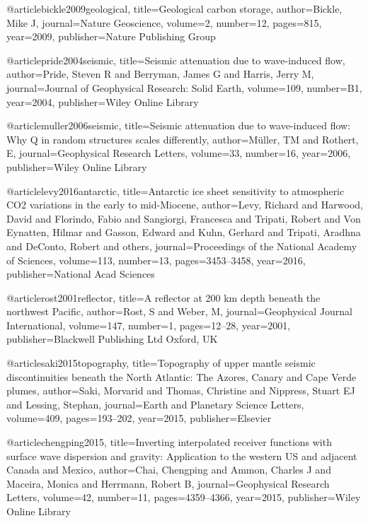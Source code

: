 @article{bickle2009geological,
  title={Geological carbon storage},
  author={Bickle, Mike J},
  journal={Nature Geoscience},
  volume={2},
  number={12},
  pages={815},
  year={2009},
  publisher={Nature Publishing Group}
}

@article{pride2004seismic,
  title={Seismic attenuation due to wave-induced flow},
  author={Pride, Steven R and Berryman, James G and Harris, Jerry M},
  journal={Journal of Geophysical Research: Solid Earth},
  volume={109},
  number={B1},
  year={2004},
  publisher={Wiley Online Library}
}

@article{muller2006seismic,
  title={Seismic attenuation due to wave-induced flow: Why Q in random structures scales differently},
  author={M{\"u}ller, TM and Rothert, E},
  journal={Geophysical Research Letters},
  volume={33},
  number={16},
  year={2006},
  publisher={Wiley Online Library}
}

@article{levy2016antarctic,
  title={Antarctic ice sheet sensitivity to atmospheric CO2 variations in the early to mid-Miocene},
  author={Levy, Richard and Harwood, David and Florindo, Fabio and Sangiorgi, Francesca and Tripati, Robert and Von Eynatten, Hilmar and Gasson, Edward and Kuhn, Gerhard and Tripati, Aradhna and DeConto, Robert and others},
  journal={Proceedings of the National Academy of Sciences},
  volume={113},
  number={13},
  pages={3453--3458},
  year={2016},
  publisher={National Acad Sciences}
}



@article{rost2001reflector,
  title={A reflector at 200 km depth beneath the northwest Pacific},
  author={Rost, S and Weber, M},
  journal={Geophysical Journal International},
  volume={147},
  number={1},
  pages={12--28},
  year={2001},
  publisher={Blackwell Publishing Ltd Oxford, UK}
}

@article{saki2015topography,
  title={Topography of upper mantle seismic discontinuities beneath the North Atlantic: The Azores, Canary and Cape Verde plumes},
  author={Saki, Morvarid and Thomas, Christine and Nippress, Stuart EJ and Lessing, Stephan},
  journal={Earth and Planetary Science Letters},
  volume={409},
  pages={193--202},
  year={2015},
  publisher={Elsevier}
}

@article{chengping2015,
  title={Inverting interpolated receiver functions with surface wave dispersion and gravity: Application to the western US and adjacent Canada and Mexico},
  author={Chai, Chengping and Ammon, Charles J and Maceira, Monica and Herrmann, Robert B},
  journal={Geophysical Research Letters},
  volume={42},
  number={11},
  pages={4359--4366},
  year={2015},
  publisher={Wiley Online Library}
}

